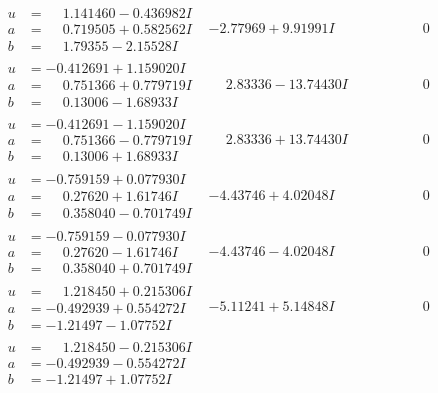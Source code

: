 \documentclass[1p]{elsarticle_modified}
\theoremstyle{definition}
\begin{document}
$$\begin{array}{c|c|c}
\begin{aligned}
u &= \phantom{-}1.141460 - 0.436982 I \\
a &= \phantom{-}0.719505 + 0.582562 I \\
b &= \phantom{-}1.79355 - 2.15528 I\end{aligned}
 & -2.77969 + 9.91991 I & \phantom{-0.000000 } 0 \\ \hline\begin{aligned}
u &= -0.412691 + 1.159020 I \\
a &= \phantom{-}0.751366 + 0.779719 I \\
b &= \phantom{-}0.13006 - 1.68933 I\end{aligned}
 & \phantom{-}2.83336 - 13.74430 I & \phantom{-0.000000 } 0 \\ \hline\begin{aligned}
u &= -0.412691 - 1.159020 I \\
a &= \phantom{-}0.751366 - 0.779719 I \\
b &= \phantom{-}0.13006 + 1.68933 I\end{aligned}
 & \phantom{-}2.83336 + 13.74430 I & \phantom{-0.000000 } 0 \\ \hline\begin{aligned}
u &= -0.759159 + 0.077930 I \\
a &= \phantom{-}0.27620 + 1.61746 I \\
b &= \phantom{-}0.358040 - 0.701749 I\end{aligned}
 & -4.43746 + 4.02048 I & \phantom{-0.000000 } 0 \\ \hline\begin{aligned}
u &= -0.759159 - 0.077930 I \\
a &= \phantom{-}0.27620 - 1.61746 I \\
b &= \phantom{-}0.358040 + 0.701749 I\end{aligned}
 & -4.43746 - 4.02048 I & \phantom{-0.000000 } 0 \\ \hline\begin{aligned}
u &= \phantom{-}1.218450 + 0.215306 I \\
a &= -0.492939 + 0.554272 I \\
b &= -1.21497 - 1.07752 I\end{aligned}
 & -5.11241 + 5.14848 I & \phantom{-0.000000 } 0 \\ \hline\begin{aligned}
u &= \phantom{-}1.218450 - 0.215306 I \\
a &= -0.492939 - 0.554272 I \\
b &= -1.21497 + 1.07752 I\end{aligned}

\end{array}$$
\end{document}
